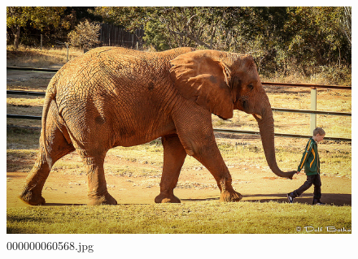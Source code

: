     \begin{figure}[h]
        \centering
        \includegraphics[width=0.8\linewidth]{../image set/easy/000000060568.jpg}
        \caption{000000060568.jpg}
    \end{figure}
